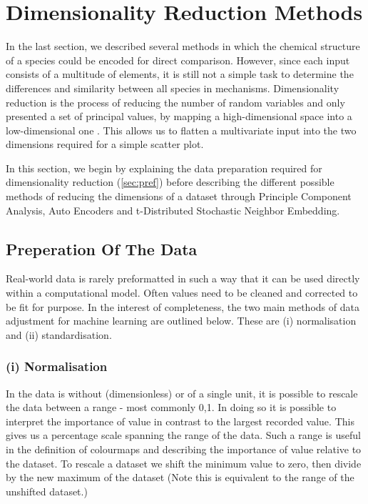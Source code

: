\section{ Dimensionality Reduction Methods}
In the last section, we described several methods in which the chemical structure of a species could be encoded for direct comparison. However, since each input consists of a multitude of elements, it is still not a simple task to determine the differences and similarity between all species in mechanisms. Dimensionality reduction is the process of reducing the number of random variables and only presented a set of principal values, by mapping a high-dimensional space into a low-dimensional one \citep{drrandom}. This allows us to flatten a multivariate input into the two dimensions required for a simple scatter plot.

In this section, we begin by explaining the data preparation required for dimensionality reduction (\autoref{sec:pref}) before describing the different possible methods of reducing the dimensions of a dataset through Principle Component Analysis, Auto Encoders and t-Distributed Stochastic Neighbor Embedding.

\subsection{Preperation Of The Data}\label{sec:prep}
Real-world data is rarely preformatted in such a way that it can be used directly within a computational model. Often values need to be cleaned and corrected to be fit for purpose. In the interest of completeness, the two main methods of data adjustment for machine learning are outlined below. These are (i) normalisation and (ii) standardisation.


\subsubsection*{(i) Normalisation}
In the data is without (dimensionless) or of a single unit, it is possible to rescale the data between a range - most commonly {0,1}. In doing so it is possible to interpret the importance of value in contrast to the largest recorded value. This gives us a percentage scale spanning the range of the data. Such a range is useful in the definition of colourmaps and describing the importance of value relative to the dataset.
To rescale a dataset we shift the minimum value to zero, then divide by the new maximum of the dataset (Note this is equivalent to the range of the unshifted dataset.)

